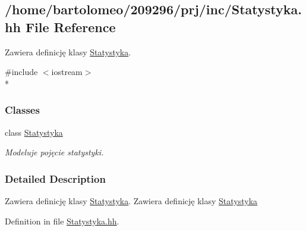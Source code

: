 \hypertarget{_statystyka_8hh}{\subsection{/home/bartolomeo/209296/prj/inc/\-Statystyka.hh File Reference}
\label{_statystyka_8hh}
}


Zawiera definicję klasy \hyperlink{class_statystyka}{Statystyka}.  


{\ttfamily \#include $<$iostream$>$}\\*
\subsubsection*{Classes}
\begin{DoxyCompactItemize}
\item 
class \hyperlink{class_statystyka}{Statystyka}
\begin{DoxyCompactList}\small\item\em Modeluje pojęcie statystyki. \end{DoxyCompactList}\end{DoxyCompactItemize}


\subsubsection{Detailed Description}
Zawiera definicję klasy \hyperlink{class_statystyka}{Statystyka}. Zawiera definicję klasy \hyperlink{class_statystyka}{Statystyka} 

Definition in file \hyperlink{_statystyka_8hh_source}{Statystyka.\-hh}.

